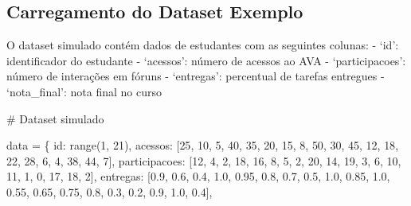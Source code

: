 \documentclass[
  letterpaper,
  DIV=11,
  numbers=noendperiod]{scrartcl}
\newenvironment{Shaded}{\begin{snugshade}}{\end{snugshade}}
\newcommand{\BuiltInTok}[1]{\textcolor[rgb]{0.00,0.23,0.31}{#1}}
\newcommand{\CommentTok}[1]{\textcolor[rgb]{0.37,0.37,0.37}{#1}}
\newcommand{\DecValTok}[1]{\textcolor[rgb]{0.68,0.00,0.00}{#1}}
\newcommand{\FloatTok}[1]{\textcolor[rgb]{0.68,0.00,0.00}{#1}}
\newcommand{\NormalTok}[1]{\textcolor[rgb]{0.00,0.23,0.31}{#1}}
\newcommand{\OperatorTok}[1]{\textcolor[rgb]{0.37,0.37,0.37}{#1}}
\newcommand{\StringTok}[1]{\textcolor[rgb]{0.13,0.47,0.30}{#1}}
\begin{document}
\subsection{Carregamento do Dataset
Exemplo}\label{carregamento-do-dataset-exemplo}

O dataset simulado contém dados de estudantes com as seguintes colunas:
- `id': identificador do estudante - `acessos': número de acessos ao AVA
- `participacoes': número de interações em fóruns - `entregas':
percentual de tarefas entregues - `nota\_final': nota final no curso

\begin{Shaded}
\begin{Highlighting}[]
\CommentTok{\# Dataset simulado}

\NormalTok{data }\OperatorTok{=}\NormalTok{ \{}
    \StringTok{\textquotesingle{}id\textquotesingle{}}\NormalTok{: }\BuiltInTok{range}\NormalTok{(}\DecValTok{1}\NormalTok{, }\DecValTok{21}\NormalTok{),}
    \StringTok{\textquotesingle{}acessos\textquotesingle{}}\NormalTok{: [}\DecValTok{25}\NormalTok{, }\DecValTok{10}\NormalTok{, }\DecValTok{5}\NormalTok{, }\DecValTok{40}\NormalTok{, }\DecValTok{35}\NormalTok{, }\DecValTok{20}\NormalTok{, }\DecValTok{15}\NormalTok{, }\DecValTok{8}\NormalTok{, }\DecValTok{50}\NormalTok{, }\DecValTok{30}\NormalTok{, }\DecValTok{45}\NormalTok{, }\DecValTok{12}\NormalTok{, }\DecValTok{18}\NormalTok{, }\DecValTok{22}\NormalTok{, }\DecValTok{28}\NormalTok{, }\DecValTok{6}\NormalTok{, }\DecValTok{4}\NormalTok{, }\DecValTok{38}\NormalTok{, }\DecValTok{44}\NormalTok{, }\DecValTok{7}\NormalTok{],}
    \StringTok{\textquotesingle{}participacoes\textquotesingle{}}\NormalTok{: [}\DecValTok{12}\NormalTok{, }\DecValTok{4}\NormalTok{, }\DecValTok{2}\NormalTok{, }\DecValTok{18}\NormalTok{, }\DecValTok{16}\NormalTok{, }\DecValTok{8}\NormalTok{, }\DecValTok{5}\NormalTok{, }\DecValTok{2}\NormalTok{, }\DecValTok{20}\NormalTok{, }\DecValTok{14}\NormalTok{, }\DecValTok{19}\NormalTok{, }\DecValTok{3}\NormalTok{, }\DecValTok{6}\NormalTok{, }\DecValTok{10}\NormalTok{, }\DecValTok{11}\NormalTok{, }\DecValTok{1}\NormalTok{, }\DecValTok{0}\NormalTok{, }\DecValTok{17}\NormalTok{, }\DecValTok{18}\NormalTok{, }\DecValTok{2}\NormalTok{],}
    \StringTok{\textquotesingle{}entregas\textquotesingle{}}\NormalTok{: [}\FloatTok{0.9}\NormalTok{, }\FloatTok{0.6}\NormalTok{, }\FloatTok{0.4}\NormalTok{, }\FloatTok{1.0}\NormalTok{, }\FloatTok{0.95}\NormalTok{, }\FloatTok{0.8}\NormalTok{, }\FloatTok{0.7}\NormalTok{, }\FloatTok{0.5}\NormalTok{, }\FloatTok{1.0}\NormalTok{, }\FloatTok{0.85}\NormalTok{, }\FloatTok{1.0}\NormalTok{, }\FloatTok{0.55}\NormalTok{, }\FloatTok{0.65}\NormalTok{, }\FloatTok{0.75}\NormalTok{, }\FloatTok{0.8}\NormalTok{, }\FloatTok{0.3}\NormalTok{, }\FloatTok{0.2}\NormalTok{, }\FloatTok{0.9}\NormalTok{, }\FloatTok{1.0}\NormalTok{, }\FloatTok{0.4}\NormalTok{],}

\end{Highlighting}
\end{Shaded}
\end{document}
